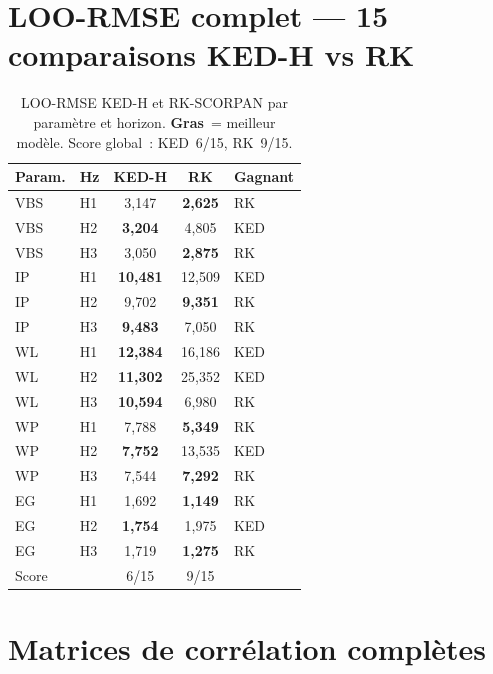 \documentclass[10pt,a4paper,twocolumn]{article}
\begin{document}
	\section{LOO-RMSE complet --- 15 comparaisons KED-H vs RK}
	\label{app:loo_complet}
	
	\begin{table}[H]
		\centering\small
		\caption{LOO-RMSE KED-H et RK-SCORPAN par paramètre et horizon.
			\textbf{Gras}~= meilleur modèle.
			Score global~: KED~6/15, RK~9/15.}
		\label{tab:loo_complet}
		\setlength{\tabcolsep}{4pt}
		\begin{tabular}{llccl}
			\toprule
			Param. & Hz & KED-H & RK & Gagnant \\
			\midrule
			VBS & H1 & 3,147          & \textbf{2,625} & RK  \\
			VBS & H2 & \textbf{3,204} & 4,805          & KED \\
			VBS & H3 & 3,050          & \textbf{2,875} & RK  \\
			IP  & H1 & \textbf{10,481}& 12,509         & KED \\
			IP  & H2 & 9,702          & \textbf{9,351} & RK  \\
			IP  & H3 & \textbf{9,483} & 7,050          & RK  \\
			WL  & H1 & \textbf{12,384}& 16,186         & KED \\
			WL  & H2 & \textbf{11,302}& 25,352         & KED \\
			WL  & H3 & \textbf{10,594}& 6,980          & RK  \\
			WP  & H1 & 7,788          & \textbf{5,349} & RK  \\
			WP  & H2 & \textbf{7,752} & 13,535         & KED \\
			WP  & H3 & 7,544          & \textbf{7,292} & RK  \\
			EG  & H1 & 1,692          & \textbf{1,149} & RK  \\
			EG  & H2 & \textbf{1,754} & 1,975          & KED \\
			EG  & H3 & 1,719          & \textbf{1,275} & RK  \\
			\midrule
			\multicolumn{2}{l}{Score} & 6/15 & 9/15 & \\
			\bottomrule
		\end{tabular}
	\end{table}
	
	\section{Matrices de corrélation complètes}
	\label{app:correlations}
	
\end{document}
